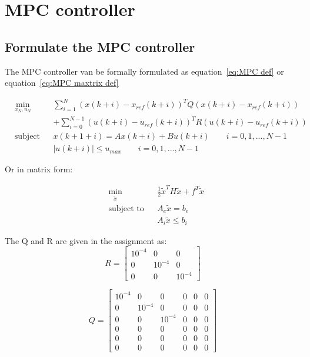 \section{MPC controller}
\subsection{Formulate the MPC controller}
The MPC controller van be formally formulated as equation~\ref{eq:MPC def} or equation~\ref{eq:MPC maxtrix def}

\begin{equation}
	\begin{aligned}
		& \min_{x_N,u_N}
		& & \sum^{N}_{i=1} 	(x(k+i) - x_{ref}(k+i))^TQ(x(k+i) - x_{ref}(k+i)) \\
		& & & + \sum^{N-1}_{i=0} 	(u(k+i) - u_{ref}(k+i))^TR(u(k+i) - u_{ref}(k+i))\\
		& \text{subject to}
		& & x(k+1+i) = Ax(k+i) +Bu(k+i) \qquad    i=0,1,..., N-1\\
		&&& |u(k+i)| \leq u_{max} \qquad    i=0,1,..., N-1
	\end{aligned}
	\label{eq:MPC def}
\end{equation}

Or in matrix form:

\begin{equation}
	\begin{aligned}
		& \min_{\tilde{x}}
		& & \frac{1}{2} \tilde{x}^TH\tilde{x}+f^T\tilde{x} \\
		& \text{subject to}
		& & A_e \tilde{x} = b_e \\
		& & & A_i \tilde{x} \leq b_i
	\end{aligned}
	\label{eq:MPC maxtrix def}
\end{equation}

The Q and R are given in the assignment as: 
$$
R =
\begin{bmatrix}
10^{-4} & 0 & 0 \\
0 & 10^{-4} & 0 \\
0 & 0 & 10^{-4}
\end{bmatrix}
$$

$$
Q =
\begin{bmatrix}
10^{-4} & 0 & 0 & 0 & 0 & 0\\
0 & 10^{-4} & 0 & 0 & 0 & 0\\
0 & 0 & 10^{-4} & 0 & 0 & 0\\
0 & 0 & 0 & 0 & 0 & 0 \\
0 & 0 & 0 & 0 & 0 & 0 \\
0 & 0 & 0 & 0 & 0 & 0 
\end{bmatrix}
$$

